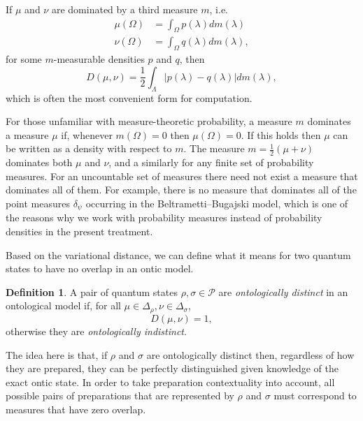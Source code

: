 \documentclass[DIV=calc,fontsize=12pt]{scrartcl} %
\theoremstyle{definition}
\newtheorem{definition}{Definition}[section]
\theoremstyle{plain}
\begin{document}
If $\mu$ and $\nu$ are dominated by a third measure $m$, i.e.
\begin{align}
\mu(\Omega) & = \int_{\Omega} p(\lambda)dm(\lambda) \\
\nu(\Omega) & = \int_{\Omega} q(\lambda) dm(\lambda),
\end{align}
for some $m$-measurable densities $p$ and $q$, then
\begin{equation}
\label{eq:POEM:intvar}
D(\mu, \nu) = \frac{1}{2} \int_{\Lambda} \left | p(\lambda) -
q(\lambda) \right | dm(\lambda),
\end{equation}
which is often the most convenient form for computation.

For those unfamiliar with measure-theoretic probability, a measure $m$
dominates a measure $\mu$ if, whenever $m(\Omega) = 0$ then
$\mu(\Omega) = 0$.  If this holds then $\mu$ can be written as a
density with respect to $m$.  The measure $m = \frac{1}{2} \left (\mu
+ \nu \right )$ dominates both $\mu$ and $\nu$, and a similarly for
any finite set of probability measures.  For an uncountable set of
measures there need not exist a measure that dominates all of them.
For example, there is no measure that dominates all of the point
measures $\delta_{\psi}$ occurring in the Beltrametti--Bugajski model,
which is one of the reasons why we work with probability measures
instead of probability densities in the present treatment.

Based on the variational distance, we can define what it means for two
quantum states to have no overlap in an ontic model.
\begin{definition}
A pair of quantum states $\rho, \sigma \in \mathcal{P}$ are
\emph{ontologically distinct} in an ontological model if, for all
$\mu \in \Delta_{\rho}, \nu \in \Delta_{\sigma}$,
\begin{equation}
D(\mu,\nu) = 1,
\end{equation}
otherwise they are \emph{ontologically indistinct}.
\end{definition}
The idea here is that, if $\rho$ and $\sigma$ are ontologically
distinct then, regardless of how they are prepared, they can be
perfectly distinguished given knowledge of the exact ontic state.  In
order to take preparation contextuality into account, all possible
pairs of preparations that are represented by $\rho$ and $\sigma$ must
correspond to measures that have zero overlap.
\end{document}
